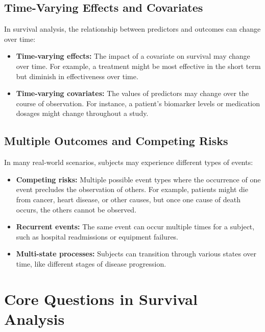 \subsection{Time-Varying Effects and Covariates}

In survival analysis, the relationship between predictors and outcomes can change over time:

\begin{itemize}
    \item \textbf{Time-varying effects:} The impact of a covariate on survival may change over time. For example, a treatment might be most effective in the short term but diminish in effectiveness over time.

    \item \textbf{Time-varying covariates:} The values of predictors may change over the course of observation. For instance, a patient's biomarker levels or medication dosages might change throughout a study.
\end{itemize}

\subsection{Multiple Outcomes and Competing Risks}

In many real-world scenarios, subjects may experience different types of events:

\begin{itemize}
    \item \textbf{Competing risks:} Multiple possible event types where the occurrence of one event precludes the observation of others. For example, patients might die from cancer, heart disease, or other causes, but once one cause of death occurs, the others cannot be observed.

    \item \textbf{Recurrent events:} The same event can occur multiple times for a subject, such as hospital readmissions or equipment failures.

    \item \textbf{Multi-state processes:} Subjects can transition through various states over time, like different stages of disease progression.
\end{itemize}

\section{Core Questions in Survival Analysis}

